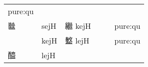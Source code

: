 \documentclass[14pt,a4paper]{scrartcl}
\begin{document}
\begin{longtable}[c]{@{}llllll@{}}
\begin{minipage}[t]{0.14\columnwidth}
pure:qu
\strut\end{minipage}\tabularnewline
\begin{minipage}[t]{0.14\columnwidth}\raggedright\strut
㡭
\strut\end{minipage} &
\begin{minipage}[t]{0.14\columnwidth}\raggedright\strut
sejH
\strut\end{minipage} &
\begin{minipage}[t]{0.14\columnwidth}\raggedright\strut
繼 kejH
\strut\end{minipage} &
\begin{minipage}[t]{0.14\columnwidth}\raggedright\strut
\strut\end{minipage} &
\begin{minipage}[t]{0.14\columnwidth}\raggedright\strut
\strut\end{minipage} &
\begin{minipage}[t]{0.14\columnwidth}\raggedright\strut
pure:qu
\strut\end{minipage}\tabularnewline
\begin{minipage}[t]{0.14\columnwidth}\raggedright\strut
𥃎
\strut\end{minipage} &
\begin{minipage}[t]{0.14\columnwidth}\raggedright\strut
kejH
\strut\end{minipage} &
\begin{minipage}[t]{0.14\columnwidth}\raggedright\strut
盭 lejH
\strut\end{minipage} &
\begin{minipage}[t]{0.14\columnwidth}\raggedright\strut
\strut\end{minipage} &
\begin{minipage}[t]{0.14\columnwidth}\raggedright\strut
\strut\end{minipage} &
\begin{minipage}[t]{0.14\columnwidth}\raggedright\strut
pure:qu
\strut\end{minipage}\tabularnewline
\begin{minipage}[t]{0.14\columnwidth}\raggedright\strut
醯
\strut\end{minipage} &
\begin{minipage}[t]{0.14\columnwidth}\raggedright\strut
lejH
\strut\end{minipage} &
\begin{minipage}[t]{0.14\columnwidth}\raggedright\strut
\strut\end{minipage} &
\begin{minipage}[t]{0.14\columnwidth}\raggedright\strut

\end{minipage}
\end{longtable}
\end{document}
